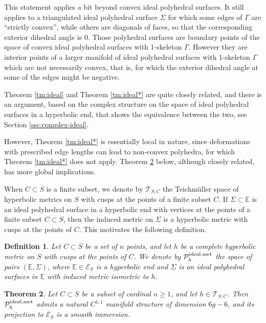 \documentclass[notitlepage,twoside,a4paper]{amsart}
\newcommand{\Pidmet}{\cP^{\rm ideal,met}_{h}}
\newtheorem{theorem}{\rm\bf Theorem}[section]
\newtheorem{definition}[theorem]{\rm\bf Definition}
\theoremstyle{named}
\newcommand{\bE}{{\mathbb E}}
\newcommand{\cE}{{\mathcal E}}
\newcommand{\cP}{{\mathcal P}}
\newcommand{\cT}{{\mathcal T}}
\newcounter{notes}%
\newcommand{\marginnote}[1]{
\refstepcounter{notes}  %
\nolinebreak
$\hspace{-5pt}{}^{\text{\tiny \rm \arabic{notes}}}$
\marginpar{\tiny \arabic{notes}) #1}
}
\begin{document}
This statement applies a bit beyond convex ideal polyhedral surfaces. It still applies to a triangulated ideal polyhedral surface $\Sigma$ for which some edges of $\Gamma$ are ``strictly convex'', while others are diagonals of faces, so that the corresponding exterior dihedral angle is $0$. Those polyhedral surfaces are boundary points of the space of convex ideal polyhedral surfaces with 1-skeleton $\Gamma$. However they are interior points of a larger manifold of ideal polyhedral surfaces with 1-skeleton $\Gamma$ which are not necessarily convex, that is, for which the exterior dihedral angle at some of the edges might be negative. %

Theorem \ref{tm:ideal} and Theorem \ref{tm:ideal*} are quite closely related, and there is an argument, based on the complex structure on the space of ideal polyhedral surfaces in a hyperbolic end, that shows the equivalence between the two, see Section \ref{ssc:complex-ideal}.

However, Theorem \ref{tm:ideal*} is essentially local in nature, since deformations with prescribed edge lengths can lead to non-convex polyhedra, for which Theorem \ref{tm:ideal*} does not apply. Theorem \ref{tm:ideal-m} below, although closely related, has more global implications.

When $C\subset S$ is a finite subset, we denote by $\cT_{S,C}$ the Teichm\"uller space of hyperbolic metrics on $S$ with cusps at the points of a finite subset $C$. If $\Sigma\subset \bE$ is an ideal polyhedral surface in a hyperbolic end with vertices at the points of a finite subset $C\subset S$, then the induced metric on $\Sigma$ is a hyperbolic metric with cusps at the points of $C$. This motivates the following definition.

\begin{definition}
  Let $C\subset S$ be a set of $n$ points, and let $h$ be a complete hyperbolic metric on $S$ with cusps at the points of $C$. We denote by $\Pidmet$ the space of pairs $(\bE,\Sigma)$, where $\bE\in \cE_S$ is a hyperbolic end and $\Sigma$ is an ideal polyhedral surfaces in $\bE$ with induced metric isometric to $h$. %
\end{definition}

\begin{theorem} \label{tm:ideal-m}
  Let $C\subset S$ be a subset of cardinal $n\geq 1$, and let $h\in \cT_{S,C}$.  Then $\Pidmet$ admits a natural $C^{1,1}$ manifold structure of dimension $6g-6$, and its projection to $\cE_S$ is a smooth immersion. %
\end{theorem}
\end{document}
